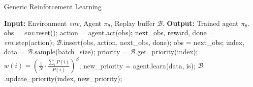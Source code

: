 \begin{algorithm}[!t]
    \caption{Generic Reinforcement Learning}
    \label{alg:off_policy_rl}
    \begin{algorithmic}[1]
        \State \textbf{Input:} Environment \textit{env}, Agent $\pi_{\theta}$, Replay buffer $\mathcal{B}$.
        \State \textbf{Output:} Trained agent $\pi_{\theta}$.
                \State obs = \textit{env}.reset(); 
            \EndIf
            \State action = agent.act(obs); 
            \State next\_obs, reward, done = \textit{env}.step(action); 
            \State $\mathcal{B}$.insert(obs, action, next\_obs, done);
            \State obs = next\_obs;
                \State index, data = $\mathcal{B}$.sample(batch\_size);
                \State priority = $\mathcal{B}$.get\_priority(index);
                    \State $w(i) = (\frac{1}{N}\cdot\frac{\sum_{i}P(i)}{P(i)})^{\beta}$; 
                \EndFor
                \State new\_priority = agent.learn(data, is);
                \State $\mathcal{B}$.update\_priority(index, new\_priority);
            \EndIf
        \EndFor
    \end{algorithmic}
\end{algorithm}

